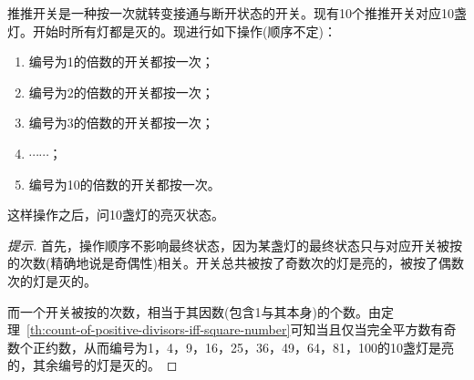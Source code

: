 \begin{example}
  推推开关是一种按一次就转变接通与断开状态的开关。现有10个推推开关对应10盏灯。开始时所有灯都是灭的。现进行如下操作(顺序不定)：
  \begin{enumerate}
  \item 编号为1的倍数的开关都按一次；
  \item 编号为2的倍数的开关都按一次；
  \item 编号为3的倍数的开关都按一次；
  \item $\cdots\cdots$；
  \item 编号为10的倍数的开关都按一次。
  \end{enumerate}
  这样操作之后，问10盏灯的亮灭状态。
\end{example}
\begin{proof}[提示]\let\qed\relax
  首先，操作顺序不影响最终状态，因为某盏灯的最终状态只与对应开关被按的次数(精确地说是奇偶性)相关。开关总共被按了奇数次的灯是亮的，被按了偶数次的灯是灭的。

  而一个开关被按的次数，相当于其因数(包含1与其本身)的个数。由定理~\ref{th:count-of-positive-divisors-iff-square-number}可知当且仅当完全平方数有奇数个正约数，从而编号为1，4，9，16，25，36，49，64，81，100的10盏灯是亮的，其余编号的灯是灭的。

\end{proof}


